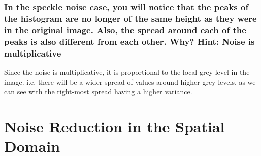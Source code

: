 \documentclass[article, 1.5space, letterpaper, 12pt, oneside, header, footer]{SydeClass}
\begin{document}
\subsubsection{In the speckle noise case, you will notice that the peaks of the histogram are no longer of the same
height as they were in the original image. Also, the spread around each of the peaks is also different
from each other. Why? Hint: Noise is multiplicative}
Since the noise is multiplicative, it is proportional to the local grey level in the image. i.e. there will be a wider spread of values around higher grey levels, as we can see with the right-most spread having a higher variance.


\clearpage
\section{Noise Reduction in the Spatial Domain}
\end{document}
